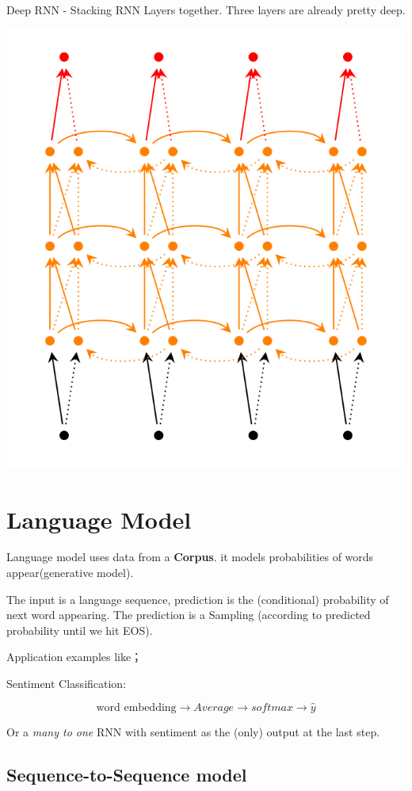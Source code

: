 \documentclass[11pt, openany]{book}              %
\begin{document}
Deep RNN - Stacking RNN Layers together. Three layers are already pretty deep.

\includegraphics[width=15cm]{DeepRNN.png}

\section{Language Model}

Language model uses data from a \textbf{Corpus}. it models probabilities of words appear(generative model).

The input is a language sequence, prediction is the (conditional) probability of next word appearing. The prediction is a Sampling (according to predicted probability until we hit EOS).

Application examples like；

Sentiment Classification:

$$\text{word embedding} \rightarrow Average \rightarrow softmax \rightarrow \hat{y}$$

Or a \textit{many to one} RNN with sentiment as the (only) output at the last step.


\subsection{Sequence-to-Sequence model}
\end{document}
